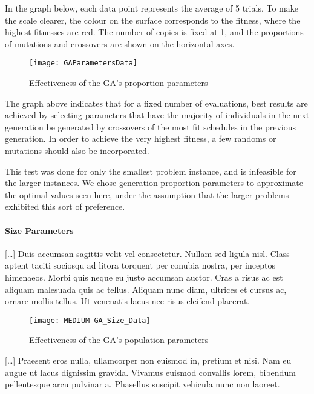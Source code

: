 \documentclass[letterpaper]{article}
\begin{document}
        In the graph below, each data point represents the average of 5 trials. To make 
        the scale clearer, the colour on the surface corresponds to the fitness, where 
        the highest fitnesses are red. The number of copies is fixed at 1, and the proportions 
        of mutations and crossovers are shown on the horizontal axes.
        
        \begin{figure}[H]
  		  \centering
  		  \texttt{[image: GAParametersData]}
  	      \caption{Effectiveness of the GA's proportion parameters}
  	      \label{graph:GAParam1}
		\end{figure}	
        
        The graph above indicates that for a fixed number of evaluations, best results are 
        achieved by selecting parameters that have the majority of individuals in the next 
        generation be generated by crossovers of the most fit schedules in the previous 
        generation. In order to achieve the very highest fitness, a few randoms or mutations 
        should also be incorporated.
        
        This test was done for only the smallest problem instance, and is infeasible for the 
        larger instances. We chose generation proportion parameters to approximate the optimal 
        values seen here, under the assumption that the larger problems exhibited this sort of 
        preference.
        
      \paragraph{Size Parameters}
       [\ldots]  Duis accumsan sagittis velit vel consectetur. Nullam sed ligula nisl. Class aptent taciti sociosqu ad litora torquent per conubia nostra, per inceptos himenaeos. Morbi quis neque eu justo accumsan auctor. Cras a risus ac est aliquam malesuada quis ac tellus. Aliquam nunc diam, ultrices et cursus ac, ornare mollis tellus. Ut venenatis lacus nec risus eleifend placerat. 
        
        \begin{figure}[H]
  		  \centering
  		  \texttt{[image: MEDIUM-GA\_Size\_Data]}
  	      \caption{Effectiveness of the GA's population parameters}
  	      \label{graph:GAParam2}
		\end{figure}
		
		[\ldots]  Praesent eros nulla, ullamcorper non euismod in, pretium et nisi. Nam eu augue ut lacus dignissim gravida. Vivamus euismod convallis lorem, bibendum pellentesque arcu pulvinar a. Phasellus suscipit vehicula nunc non laoreet.
      
\end{document}
